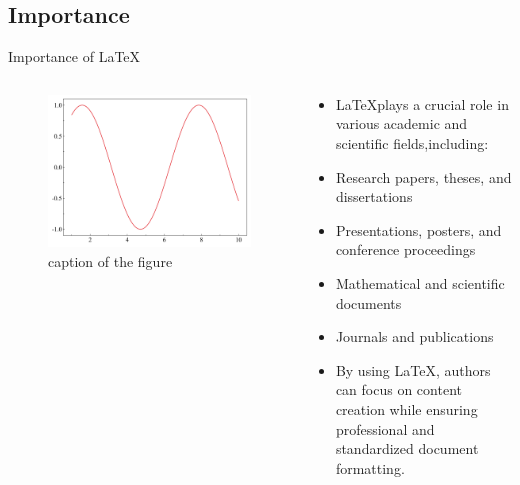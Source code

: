 \documentclass[aspectratio=169]{SUSTechBeamer}
\begin{document}
\subsection{Importance}
\begin{frame}{Importance of \LaTeX}
    \begin{columns}
        \begin{column}{0.5\textwidth}
            \begin{figure}[h]
                \centering
                \includegraphics[width=\linewidth]{demo_fig/pdffig.pdf}
                \caption{caption of the figure}
                \label{fig:fig1}
            \end{figure}
        \end{column}
    \begin{column}{0.5\textwidth}
        \begin{itemize}
          \item \LaTeX plays a crucial role in various academic and scientific fields,including:
          \item Research papers, theses, and dissertations
          \item Presentations, posters, and conference proceedings
          \item Mathematical and scientific documents
          \item Journals and publications
          \item By using \LaTeX, authors can focus on content creation while ensuring professional and standardized document formatting.
        \end{itemize}
    \end{column}
\end{columns}
\end{frame}
\end{document}
